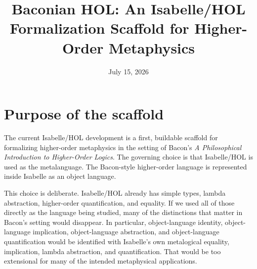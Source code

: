 \documentclass[12pt,leqno]{article}
\title{Baconian HOL: An Isabelle/HOL Formalization Scaffold for Higher-Order Metaphysics}
\author{}
\date{July 15, 2026}
\begin{document}
\maketitle

\section{Purpose of the scaffold}

The current Isabelle/HOL development is a first, buildable scaffold for
formalizing higher-order metaphysics in the setting of Bacon's
\emph{A Philosophical Introduction to Higher-Order Logics}.  The governing
choice is that Isabelle/HOL is used as the metalanguage.  The Bacon-style
higher-order language is represented inside Isabelle as an object language.

This choice is deliberate.  Isabelle/HOL already has simple types, lambda
abstraction, higher-order quantification, and equality.  If we used all of
those directly as the language being studied, many of the distinctions that
matter in Bacon's setting would disappear.  In particular, object-language
identity, object-language implication, object-language abstraction, and
object-language quantification would be identified with Isabelle's own
metalogical equality, implication, lambda abstraction, and quantification.
That would be too extensional for many of the intended metaphysical
applications.
\end{document}
